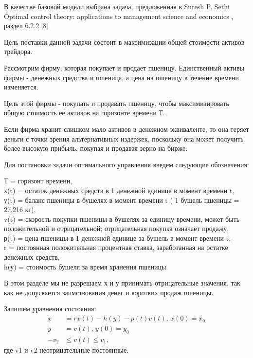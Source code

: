 
В качестве базовой модели выбрана задача, предложенная в Suresh P. Sethi  Optimal control theory: applications to management science and economics , раздел 6.2.2.[8]

Цель поставки данной задачи состоит в максимизации общей стоимости активов трейдора.

Рассмотрим фирму, которая покупает и продает пшеницу. Единственный активы фирмы - денежных средства и пшеница, а цена на пшеницу в течение времени изменяется. 

Цель этой фирмы - покупать и продавать пшеницу, чтобы максимизировать общую стоимость ее активов на горизонте времени Т.


Если фирма хранит слишком мало активов в денежном эквиваленте, то она теряет деньги с точки зрения альтернативных издержек, поскольку она может получить более высокую прибыль, покупая и продавая зерно на бирже.

Для постановки задачи оптимального управления введем следующие обозначения:
 
{Т} = горизонт времени,\\
{х(t)} = остаток денежных средств в 1 денежной единице в момент времени t,\\
{у(t)} = баланс пшеницы в бушелях в момент времени t ( 1 бушель пшеницы = 27,216 кг),\\ 
{v(t)} = скорость покупки пшеницы в бушелях за единицу времени, может быть положительной и отрицательной; отрицательная покупка означает продажу,\\
{р(t)} = цена пшеницы в  1 денежной единице за бушель в момент времени t,\\
{r} = постоянная положительная процентная ставка, заработанная на остатке денежных средств,\\
{h(у)} = стоимость бушеля за время хранения пшеницы.
 
В этом разделе мы не разрешаем {х} и {у} принимать отрицательные значения, так как не допускается заимствования денег и коротких продаж пшеницы.



Запишем уравнения состояния:
\begin{align}
    \Dot{x} & = r x(t) - h(y) - p(t) v(t),\, x(0) = x_{0} \\
    \Dot{y} & = v(t), \, y(0) = y_{0} \\
    - v_2 & \le v(t) \le v_1,
\end{align}    
где {v1} и {v2} неотрицательные постоянные. 

